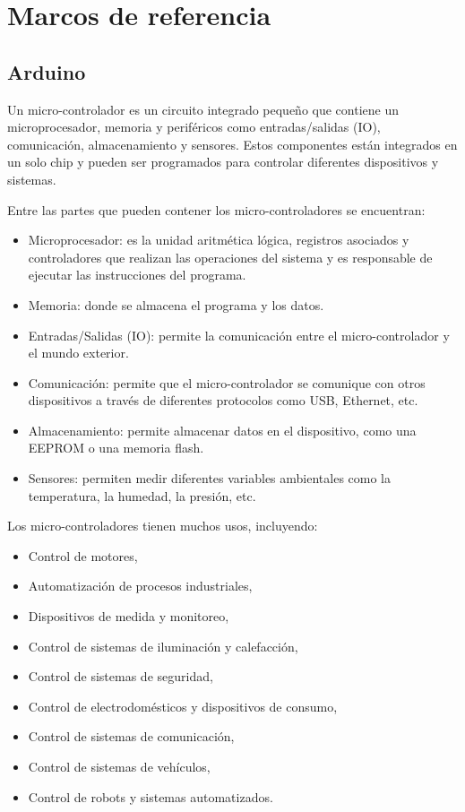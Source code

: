 \graphicspath{{../assets/99_appendices/}{../assets/common/}}
\chapter{Marcos de referencia}
\label{ApendiceA}
\section{Arduino}

Un micro-controlador es un circuito integrado pequeño que contiene un microprocesador, memoria y periféricos como entradas/salidas (IO), comunicación, almacenamiento y sensores. Estos componentes están integrados en un solo chip y pueden ser programados para controlar diferentes dispositivos y sistemas.

Entre las partes que pueden contener los micro-controladores se encuentran: 

\begin{itemize}
    \item Microprocesador: es la unidad aritmética lógica,  registros asociados y controladores  que realizan  las operaciones del sistema y es responsable de ejecutar las instrucciones del programa.
    \item Memoria: donde se almacena el programa y los datos.
    \item Entradas/Salidas (IO): permite la comunicación entre el micro-controlador y el mundo exterior.
    \item Comunicación: permite que el micro-controlador se comunique con otros dispositivos a través de diferentes protocolos como USB, Ethernet, etc.
    \item Almacenamiento: permite almacenar datos en el dispositivo, como una EEPROM o una memoria flash.
    \item Sensores: permiten medir diferentes variables ambientales como la temperatura, la humedad, la presión, etc.
\end{itemize}

Los micro-controladores tienen muchos usos, incluyendo: 
\begin{itemize}
    \item Control de motores,
    \item Automatización de procesos industriales,
    \item Dispositivos de medida y monitoreo,
    \item Control de sistemas de iluminación y calefacción,
    \item Control de sistemas de seguridad,
    \item Control de electrodomésticos y dispositivos de consumo,
    \item Control de sistemas de comunicación,
    \item Control de sistemas de vehículos,
    \item Control de robots y sistemas automatizados.
\end{itemize}
